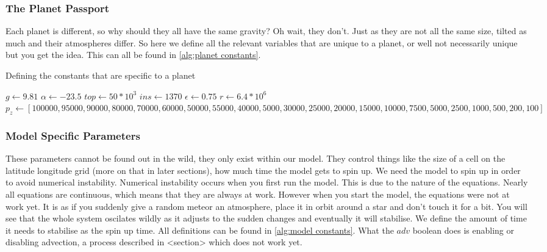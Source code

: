 \subsubsection{The Planet Passport}
Each planet is different, so why should they all have the same gravity? Oh wait, they don't. Just as they are not all the same size, tilted as much and their atmospheres differ. So here we define
all the relevant variables that are unique to a planet, or well not necessarily unique but you get the idea. This can all be found in \autoref{alg:planet constants}.

\begin{algorithm}
    \caption{Defining the constants that are specific to a planet}
    \label{alg:planet constants}
    $g \leftarrow 9.81$ 
    $\alpha \leftarrow -23.5$ 
    $top \leftarrow 50*10^3$ 
    $ins \leftarrow 1370$ 
    $\epsilon \leftarrow 0.75$ 
    $r \leftarrow 6.4*10^6$ 
    $p_z \leftarrow [100000, 95000, 90000, 80000, 70000, 60000, 50000, 55000, 40000, 5000, 30000, 25000, 20000, 15000, 10000, 7500, 5000, 2500, 1000, 500, 200, 100]$ 
\end{algorithm}

\subsubsection{Model Specific Parameters}
These parameters cannot be found out in the wild, they only exist within our model. They control things like the size of a cell on the latitude longitude grid (more on that in later sections),
how much time the model gets to spin up. We need the model to spin up in order to avoid numerical instability. Numerical instability occurs when you first run the model. This is due to the nature of the equations. Nearly all equations are continuous, which means that they are always at work. However 
when you start the model, the equations were not at work yet. It is as if you suddenly give a random meteor an atmosphere, place it in orbit around a star and don't touch it for a bit. You will 
see that the whole system oscilates wildly as it adjusts to the sudden changes and eventually it will stabilise. We define the amount of time it needs to stabilise as the spin up time. All 
definitions can be found in \autoref{alg:model constants}. What the $adv$ boolean does is enabling or disabling advection, a process described in <section> which does not work yet.


